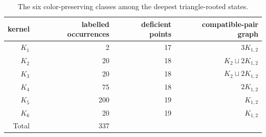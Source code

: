 \begin{table}[ht]
\centering
\small
\caption{The six color-preserving classes among the deepest triangle-rooted states.}
\label{tab:triangle-kernels}
\begin{tabular}{rrrr}
\toprule
kernel & labelled occurrences & deficient points & compatible-pair graph\\
\midrule
$K_1$ & 2 & 17 & $3K_{1,2}$\\
$K_2$ & 20 & 18 & $K_2\sqcup2K_{1,2}$\\
$K_3$ & 20 & 18 & $K_2\sqcup2K_{1,2}$\\
$K_4$ & 75 & 18 & $2K_{1,2}$\\
$K_5$ & 200 & 19 & $K_{1,2}$\\
$K_6$ & 20 & 19 & $K_{1,2}$\\
\midrule
Total & 337 & &\\
\bottomrule
\end{tabular}
\end{table}
